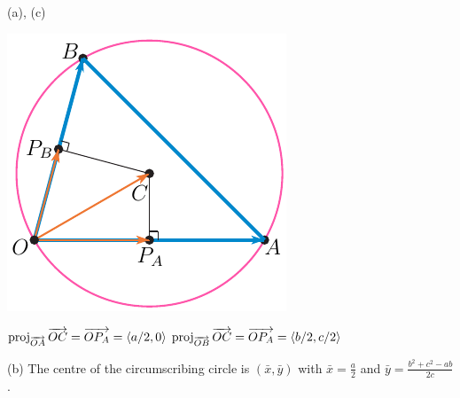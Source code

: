 \begin{answer}
(a), (c)
\begin{center}
     \includegraphics{fig/circumA.pdf}
\end{center}
$\text{proj}_{\overrightarrow{\scriptstyle OA}}\,\overrightarrow{OC}
    =\overrightarrow{OP_A}=\left< a/2,0\right>$\qquad
$\text{proj}_{\overrightarrow{\scriptstyle OB}}\,\overrightarrow{OC}
    =\overrightarrow{OP_A}=\left< b/2,c/2\right>$

(b) The centre of the circumscribing circle is $(\bar x,\bar y)$ with
$\bar x=\frac{a}{2}$ and
$ \bar y =\frac{b^2+c^2-ab}{2c}$.
\end{answer}

